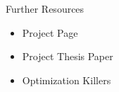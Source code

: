 \begin{frame}{Further Resources}
	\begin{itemize}
		\item Project Page~\cite{Reiser2017}
		\item Project Thesis Paper~\cite{Reiser2016}
		\item Optimization Killers~\cite{bluebird2017}
	\end{itemize}
\end{frame}

\begin{frame}[allowframebreaks]
	\printbibliography
\end{frame}
